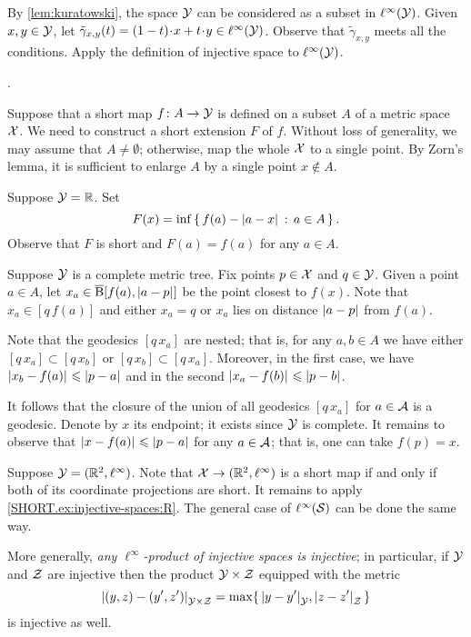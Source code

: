 By \ref{lem:kuratowski}, the space $\mathcal{Y}$ can be considered as a subset in $\ell^\infty(\mathcal{Y})$.
Given $x,y\in \mathcal{Y}$, let $\tilde\gamma_{x,y}(t)=(1-t)\cdot x+t\cdot y\in \ell^\infty(\spc{Y})$.
Observe that $\tilde\gamma_{x,y}$ meets all the conditions.
Apply the definition of injective space to $\ell^\infty(\mathcal{Y})$.

 \cite[3.6]{lang-2013}.

Suppose that a short map $f\colon A\to\mathcal{Y}$ is defined on a subset $A$ of a metric space $\mathcal{X}$.
We need to construct a short extension $F$ of $f$.
Without loss of generality, we may assume that $A\ne\emptyset$;
otherwise, map the whole $\mathcal{X}$ to a single point.
By Zorn's lemma, it is sufficient to enlarge $A$ by a single point $x\notin A$.

Suppose $\mathcal{Y}=\mathbb{R}$.
Set 
\[F(x)=\inf\set{f(a)-\dist{a}{x}{}}{a\in A}.\] 
Observe that $F$ is short and $F(a)=f(a)$ for any $a\in A$.

Suppose  $\mathcal{Y}$ is a complete metric tree.
Fix points $p\in \mathcal{X}$ and $q\in\mathcal{Y}$.
Given a point $a\in A$,
let $x_a\in\cBall[f(a),\dist{a}{p}{}]$ be the point closest to $f(x)$.
Note that $x_a\in[q\,f(a)]$ and either $x_a=q$ or $x_a$ lies on distance $\dist{a}{p}{}$ from $f(a)$.

Note that the geodesics $[q\,x_a]$ are nested;
that is, for any $a,b\in A$ we have either $[q\,x_a]\subset [q\,x_b]$ or $[q\,x_b]\subset [q\,x_a]$.
Moreover, in the first case, we have $\dist{x_b}{f(a)}{}\le \dist{p}{a}{}$ and in the second $\dist{x_a}{f(b)}{}\le \dist{p}{b}{}$.

It follows that the closure of the union of all geodesics $[q\,x_a]$ for $a\in\mathcal{A}$ is a geodesic.
Denote by $x$ its endpoint; it exists since $\mathcal{Y}$ is complete.
It remains to observe that $\dist{x}{f(a)}{}\le \dist{p}{a}{}$ for any $a\in\mathcal{A}$;
that is, one can take $f(p)=x$.

Suppose $\mathcal{Y}=(\mathbb{R}^2,\ell^\infty)$.
Note that $\mathcal{X}\to (\mathbb{R}^2,\ell^\infty)$ is a short map if and only if both of its coordinate projections are short.
It remains to apply \ref{SHORT.ex:injective-spaces:R}.
The general case of $\ell^\infty(\mathcal{S})$ can be done the same way.

More generally, \textit{any $\ell^\infty$-product of injective spaces is injective};
in particular, if $\mathcal{Y}$ and $\mathcal{Z}$ are injective then the product $\mathcal{Y}\times\mathcal{Z}$ equipped with the metric 
\[\dist{(y,z)}{(y',z')}{\spc{Y}\times\spc{Z}}=\max\{\,\dist{y}{y'}{\spc{Y}},\dist{z}{z'}{\spc{Z}}\,\}\]
is injective as well.


